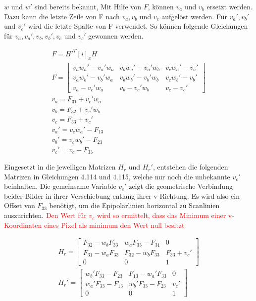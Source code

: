 $w$ und $w'$ sind bereits bekannt, Mit Hilfe von $F$, können $v_a$ und $v_b$ ersetzt werden. Dazu kann die letzte Zeile von F nach $v_a, v_b$ und $v_c$ aufgelöst werden. Für $v_a', v_b'$ und $v_c'$ wird die letzte Spalte von F verwendet. So können folgende Gleichungen für $v_a, v_a',v_b, v_b', v_c$ und $v_c'$ gewonnen werden. 

\begin{gather}
	F = H'^T[i]_xH\\
	F=
	\begin{bmatrix}
	v_aw_a' - v_a'w_a&v_bw_a' - v_a'w_b&v_cw_a' - v_a'\\
	v_aw_b' - v_b'w_a&v_bw_b' - v_b'w_b&v_cw_b' - v_b'\\
	v_a - v_c'w_a&v_b - v_c'w_b&v_c-v_c'
	\end{bmatrix}\\
	v_a = F_{31}+v_c'w_a\\
	v_b = F_{32}+v_c'w_b\\
	v_c = F_{33}+v_c'\\
	v_a' = v_cw_a'-F_{13}\\
	v_b' = v_cw_b'-F_{23}\\
	v_c' = v_c -F_{33}
\end{gather}

Eingesetzt in die jeweiligen Matrizen $H_r$ und $H_r'$, entstehen die folgenden Matrizen in Gleichungen 4.114 und 4.115, welche nur noch die unbekannte $v_c'$ beinhalten. Die gemeinsame Variable $v_c'$ zeigt die geometrische Verbindung beider Bilder in ihrer Verschiebung entlang ihrer v-Richtung. Es wird also ein Offset von $F_33$ benötigt, um die Epipolarlinien horizontal zu Scanlinien auszurichten. \textcolor{red}{Den Wert für $v_c$ wird so ermittelt, dass das Minimum einer v-Koordinaten eines Pixel als minimum den Wert null besitzt }

\begin{gather}
	H_r = \begin{bmatrix}
	F_{32}-w_bF_{33}&w_aF_{33}-F_{31}&0\\
	F_{31}-w_aF_{33}&F_{32}-w_bF_{33}&F_{33}+v_c'\\
	0&0&1
	\end{bmatrix}\\
	H_r'=
	\begin{bmatrix}
	w_b'F_{33}-F_{23}&F_{13}-w_a'F_{33}&0\\
	w_a'F_{33}-F_{13}&w_b'F_{33}-F_{23}&v_c'\\
	0&0&1
	\end{bmatrix}
\end{gather}\\

